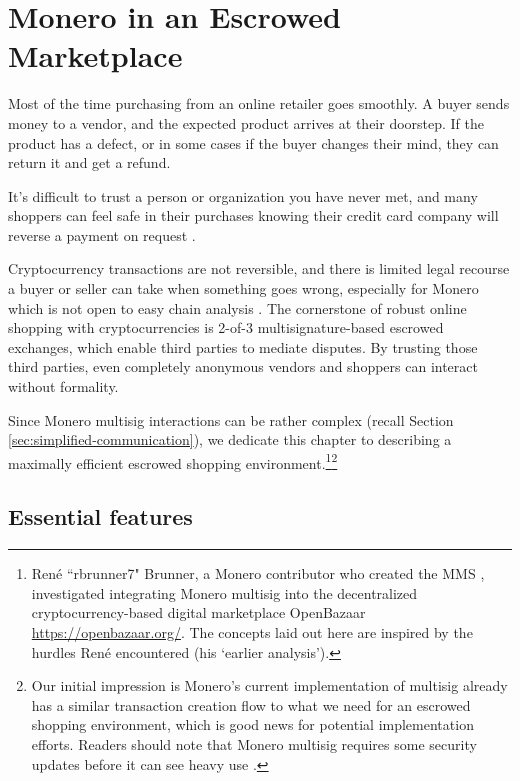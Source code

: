 \chapter{Monero in an Escrowed Marketplace}
\label{chapter:escrowed-market}

Most of the time purchasing from an online retailer goes smoothly. A buyer sends money to a vendor, and the expected product arrives at their doorstep. If the product has a defect, or in some cases if the buyer changes their mind, they can return it and get a refund.

It's difficult to trust a person or organization you have never met, and many shoppers can feel safe in their purchases knowing their credit card company will reverse a payment on request \cite{credit-card-reversals}.

Cryptocurrency transactions are not reversible, and there is limited legal recourse a buyer or seller can take when something goes wrong, especially for Monero which is not open to easy chain analysis \cite{chainalysis-2020-report}. The cornerstone of robust online shopping with cryptocurrencies is 2-of-3 multisignature-based escrowed exchanges, which enable third parties to mediate disputes. By trusting those third parties, even completely anonymous vendors and shoppers can interact without formality.

Since Monero multisig interactions can be rather complex (recall Section \ref{sec:simplified-communication}), we dedicate this chapter to describing a maximally efficient escrowed shopping environment.\footnote{Ren\'e ``rbrunner7" Brunner, a Monero contributor who created the MMS \cite{mms-project-proposal, mms-manual}, investigated integrating Monero multisig into the decentralized cryptocurrency-based digital marketplace OpenBazaar \url{https://openbazaar.org/}. The concepts laid out here are inspired by the hurdles Ren\'e encountered \cite{openbazaar-rbrunner-investigation} (his `earlier analysis').}\footnote{Our initial impression is Monero's current implementation of multisig already has a similar transaction creation flow to what we need for an escrowed shopping environment, which is good news for potential implementation efforts. Readers should note that Monero multisig requires some security updates before it can see heavy use \cite{multisig-research-issue-67}.}



\section{Essential features}
\label{sec:escrowed-marketplace-essential-features}

